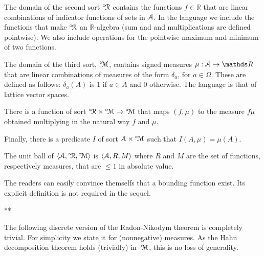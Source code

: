 \documentclass[12pt,letterpaper,oneside,reqno]{amsart}
\theoremstyle{plain}
\theoremstyle{remark}
\begin{document}


The domain of the second sort ${}^{\circ\!}{\EuScript R}$ contains the functions $f\in{\mathds R}$ that are linear combinations of indicator functions of sets in ${\EuScript A}$.
In the language we include the functions that make ${}^{\circ\!}{\EuScript R}$ an ${\mathds R}$-algebra (sum and and multiplications are defined pointwise).
We also include operations for the pointwise maximum and minimum of two functions.

The domain of the third sort, ${}^{\circ\!}{\EuScript M}$, contains signed measures $\mu:{\EuScript A}\to{\mathds R}$ that are linear combinations of measures of the form $\delta_a$, for $a\in\Omega$.
These are defined as follows: $\delta_a(A)$ is $1$ if $a\in A$ and $0$ otherwise.
The language is that of lattice vector spaces.

There is a function of sort ${}^{\circ\!}{\EuScript R}\times{}^{\circ\!}{\EuScript M}\to{}^{\circ\!}{\EuScript M}$ that maps $(f,\mu)$ to the measure $f\mu$ obtained multiplying in the natural way $f$ and $\mu$.

Finally, there is a predicate $I$ of sort ${\EuScript A}\times{}^{\circ\!}{\EuScript M}$ such that $I(A,\mu)=\mu(A)$.

The unit ball of $\langle{\EuScript A},{}^{\circ\!}{\EuScript R},{}^{\circ\!}{\EuScript M}\rangle$ is $\langle{\EuScript A},R,M\rangle$ where $R$ and $M$ are the set of functions, respectively measures,  that are $\le1$ in absolute value.

The readers can easily convince themselfs that a bounding function exist.
Its explicit definition is not required in the sequel.

\hfil ***

The following discrete version of the Radon-Nikodym theorem is completely trivial.
For simplicity we state it for (nonnegative) measures.
As the Hahn decomposition theorem holds (trivially) in ${}^{\circ\!}{\EuScript M}$, this is no loss of generality.
\end{document}
